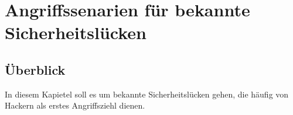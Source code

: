 \section{Angriffssenarien für bekannte Sicherheitslücken}\label{seneario_fuer_angriffe}

\subsection*{Überblick}\label{ueberblick}
In diesem Kapietel soll es um bekannte Sicherheitslücken gehen, die häufig von Hackern als erstes Angriffsziehl dienen.
